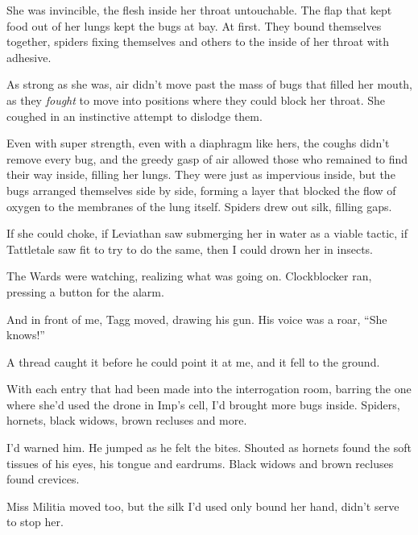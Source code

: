 She was invincible, the flesh inside her throat untouchable.  The flap that kept food out of her lungs kept the bugs at bay.  At first.  They bound themselves together, spiders fixing themselves and others to the inside of her throat with adhesive.



As strong as she was, air didn't move past the mass of bugs that filled her mouth, as they \emph{fought }to move into positions where they could block her throat.  She coughed in an instinctive attempt to dislodge them.



Even with super strength, even with a diaphragm like hers, the coughs didn't remove every bug, and the greedy gasp of air allowed those who remained to find their way inside, filling her lungs.  They were just as impervious inside, but the bugs arranged themselves side by side, forming a layer that blocked the flow of oxygen to the membranes of the lung itself.  Spiders drew out silk, filling gaps.



If she could choke, if Leviathan saw submerging her in water as a viable tactic, if Tattletale saw fit to try to do the same, then I could drown her in insects.



The Wards were watching, realizing what was going on.  Clockblocker ran, pressing a button for the alarm.



And in front of me, Tagg moved, drawing his gun.  His voice was a roar, ``She knows!''



A thread caught it before he could point it at me, and it fell to the ground.



With each entry that had been made into the interrogation room, barring the one where she'd used the drone in Imp's cell, I'd brought more bugs inside.  Spiders, hornets, black widows, brown recluses and more.



I'd warned him.  He jumped as he felt the bites.  Shouted as hornets found the soft tissues of his eyes, his tongue and eardrums.  Black widows and brown recluses found crevices.



Miss Militia moved too, but the silk I'd used only bound her hand, didn't serve to stop her.



